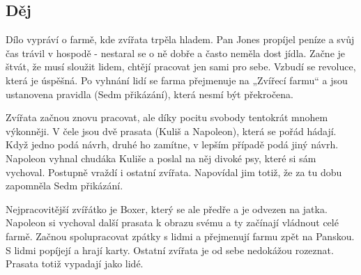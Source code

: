     \subsection*{Děj}
        Dílo vypráví o farmě, kde zvířata trpěla hladem. 
        Pan Jones propíjel peníze a svůj čas trávil v hospodě - nestaral se o ně dobře a často neměla dost jídla.
        Začne je štvát, že musí sloužit lidem, chtějí pracovat jen sami pro sebe. Vzbudí se revoluce, která je úspěšná.
        Po vyhnání lidí se farma přejmenuje na „Zvířecí farmu“ a jsou ustanovena pravidla (Sedm přikázání), která nesmí být překročena.

        Zvířata začnou znovu pracovat, ale díky pocitu svobody tentokrát mnohem výkonněji.
        V čele jsou dvě prasata (Kuliš a Napoleon), která se pořád hádají. Když jedno podá návrh, druhé ho zamítne, v lepším případě podá jiný návrh.
        Napoleon vyhnal chudáka Kuliše a poslal na něj divoké psy, které si sám vychoval.
        Postupně vraždí i ostatní zvířata. Napovídal jim totiž, že za tu dobu zapomněla Sedm přikázání. 
        
        Nejpracovitější zvířátko je Boxer, který se ale předře a je odvezen na jatka.
        Napoleon si vychoval další prasata k obrazu svému a ty začínají vládnout celé farmě.
        Začnou spolupracovat zpátky s lidmi a přejmenují farmu zpět na Panskou. S lidmi popíjejí a hrají karty.
        Ostatní zvířata je od sebe nedokážou rozeznat. Prasata totiž vypadají jako lidé.
